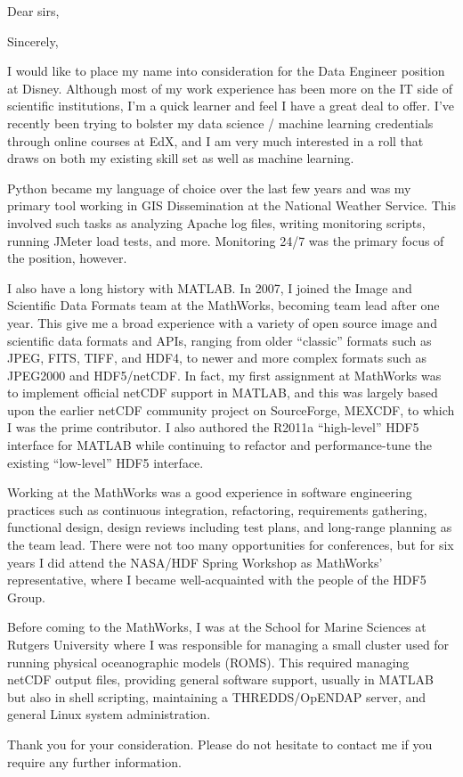 \documentclass[11pt]{moderncv}  %
\begin{document}
\opening{Dear sirs,}
\closing{Sincerely,}


\makelettertitle

I would like to place my name into consideration for the Data
Engineer position at Disney.  Although most of my work experience
has been more on the IT side of scientific institutions, I'm a quick
learner and feel I have a great deal to offer.  
I've recently been trying to bolster my data science / machine learning
credentials through online courses at EdX, and I am very much interested
in a roll that draws on both my existing skill set as well as machine learning. 

Python became my language of choice over the last few years and was
my primary tool working in GIS Dissemination at the National Weather
Service.  This involved such tasks as analyzing Apache log files,
writing monitoring scripts, running JMeter load tests, and more.
Monitoring 24/7 was the primary focus of the position, however.

I also have a long history with MATLAB.  In 2007, I joined the Image
and Scientific Data Formats team at the MathWorks, becoming  team
lead after one year.  This give me a broad experience with a variety
of open source image and scientific data formats and APIs, ranging
from older “classic” formats such as JPEG, FITS, TIFF, and HDF4,
to newer and more complex formats such as JPEG2000 and HDF5/netCDF.
In fact, my first assignment at MathWorks was to implement official
netCDF support in MATLAB, and this was largely based upon the earlier
netCDF community project on SourceForge, MEXCDF, to which I was the
prime contributor.   I also authored the R2011a “high-level” HDF5
interface for MATLAB while continuing to refactor and performance-tune
the existing “low-level” HDF5 interface.

Working at the MathWorks was a good experience in software engineering
practices such as continuous integration, refactoring, requirements
gathering, functional design, design reviews including test plans,
and long-range planning as the team lead.   There were not too many
opportunities for conferences, but for six years I did attend the
NASA/HDF Spring Workshop as MathWorks’ representative, where I
became well-acquainted with the people of the HDF5 Group.

Before coming to the MathWorks, I was at the School for Marine
Sciences at Rutgers University where I was responsible for managing
a small cluster used for running physical oceanographic models
(ROMS).  This required managing  netCDF output files, providing
general software support, usually in MATLAB but also in shell
scripting, maintaining a THREDDS/OpENDAP server, and general Linux
system administration.

Thank you for your consideration.  Please do not hesitate to contact
me if you require any further information.

\makeletterclosing
\end{document}
